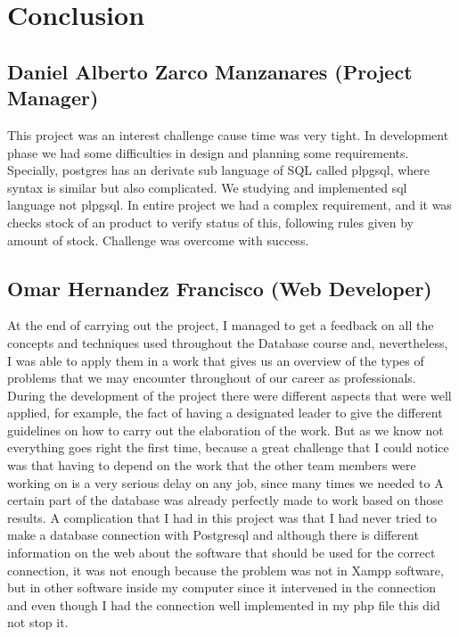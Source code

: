 \documentclass{article}
\begin{document}
\section{Conclusion}
\subsection{Daniel Alberto Zarco Manzanares (Project Manager)}
This project was an interest challenge cause time was very tight. In development phase we had some difficulties in design and planning some requirements. Specially, postgres has an derivate sub language of SQL called plpgsql, where syntax is similar but also complicated. We studying and implemented sql language not plpgsql. In entire project we had a complex requirement, and it was checks stock of an product to verify status of this, following rules given by amount of stock.
Challenge was overcome with success.
\subsection{Omar Hernandez Francisco (Web Developer)}
At the end of carrying out the project, I managed to get a feedback on all the concepts and techniques used throughout the Database course and, nevertheless, I was able to apply them in a work that gives us an overview of the types of problems that we may encounter throughout of our career as professionals.
During the development of the project there were different aspects that were well applied, for example, the fact of having a designated leader to give the different guidelines on how to carry out the elaboration of the work. But as we know not everything goes right the first time, because a great challenge that I could notice was that having to depend on the work that the other team members were working on is a very serious delay on any job, since many times we needed to A certain part of the database was already perfectly made to work based on those results.
A complication that I had in this project was that I had never tried to make a database connection with Postgresql and although there is different information on the web about the software that should be used for the correct connection, it was not enough because the problem was not in Xampp software, but in other software inside my computer since it intervened in the connection and even though I had the connection well implemented in my php file this did not stop it.
\end{document}
